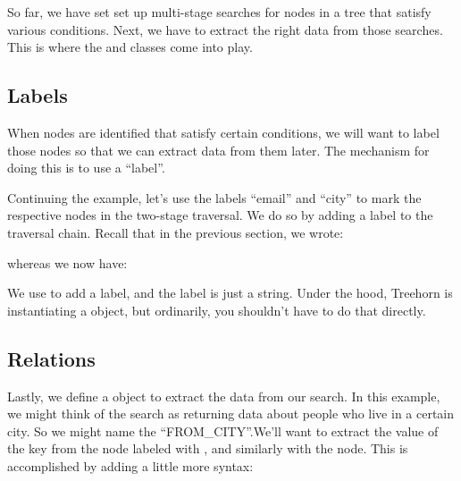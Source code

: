 \documentclass[letterpaper,10pt,english]{sphinxmanual}
\begin{document}
So far, we have set set up multi-stage searches for nodes in a tree that satisfy various conditions. Next, we have to extract the right data from those searches. This is where the  and  classes come into play.


\subsection{Labels}
\label{\detokenize{treehorn:labels}}
When nodes are identified that satisfy certain conditions, we will want to label those nodes so that we can extract data from them later. The mechanism for doing this is to use a “label”.

Continuing the example, let’s use the labels “email” and “city” to mark the respective nodes in the two-stage traversal. We do so by adding a label to the traversal chain. Recall that in the previous section, we wrote:

%
\begin{sphinxVerbatim}[commandchars=\\\{\}]
    
\end{sphinxVerbatim}

whereas we now have:

%
\begin{sphinxVerbatim}[commandchars=\\\{\}]
        
\end{sphinxVerbatim}

We use \sphinxcode{\sphinxupquote{+}} to add a label, and the label is just a string. Under the hood, Treehorn is instantiating a  object, but ordinarily, you shouldn’t have to do that directly.


\subsection{Relations}
\label{\detokenize{treehorn:relations}}
Lastly, we define a  object to extract the data from our search. In this example, we might think of the search as returning data about people who live in a certain city. So we might name the  “FROM\_CITY”.We’ll want to extract the value of the  key from the node labeled with , and similarly with the  node. This is accomplished by adding a little more syntax:
\end{document}
